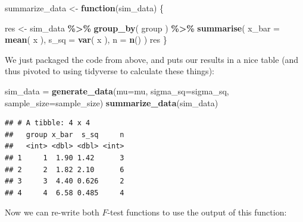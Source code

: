\documentclass[
]{book}
\newenvironment{Shaded}{\begin{snugshade}}{\end{snugshade}}
\newcommand{\AttributeTok}[1]{\textcolor[rgb]{0.13,0.29,0.53}{#1}}
\newcommand{\ControlFlowTok}[1]{\textcolor[rgb]{0.13,0.29,0.53}{\textbf{#1}}}
\newcommand{\FunctionTok}[1]{\textcolor[rgb]{0.13,0.29,0.53}{\textbf{#1}}}
\newcommand{\NormalTok}[1]{#1}
\newcommand{\OtherTok}[1]{\textcolor[rgb]{0.56,0.35,0.01}{#1}}
\newcommand{\SpecialCharTok}[1]{\textcolor[rgb]{0.81,0.36,0.00}{\textbf{#1}}}
\begin{document}
\begin{Shaded}
\begin{Highlighting}[]
\NormalTok{summarize\_data }\OtherTok{\textless{}{-}} \ControlFlowTok{function}\NormalTok{(sim\_data) \{}
  
\NormalTok{  res }\OtherTok{\textless{}{-}}\NormalTok{ sim\_data }\SpecialCharTok{\%\textgreater{}\%} 
    \FunctionTok{group\_by}\NormalTok{( group ) }\SpecialCharTok{\%\textgreater{}\%}
    \FunctionTok{summarise}\NormalTok{( }\AttributeTok{x\_bar =} \FunctionTok{mean}\NormalTok{( x ),}
               \AttributeTok{s\_sq =} \FunctionTok{var}\NormalTok{( x ),}
               \AttributeTok{n =} \FunctionTok{n}\NormalTok{() )}
\NormalTok{  res}
\NormalTok{\}}
\end{Highlighting}
\end{Shaded}

We just packaged the code from above, and puts our results in a nice table (and thus pivoted to using tidyverse to calculate these things):

\begin{Shaded}
\begin{Highlighting}[]
\NormalTok{sim\_data }\OtherTok{=} \FunctionTok{generate\_data}\NormalTok{(}\AttributeTok{mu=}\NormalTok{mu, }\AttributeTok{sigma\_sq=}\NormalTok{sigma\_sq, }\AttributeTok{sample\_size=}\NormalTok{sample\_size)}
\FunctionTok{summarize\_data}\NormalTok{(sim\_data)}
\end{Highlighting}
\end{Shaded}

\begin{verbatim}
## # A tibble: 4 x 4
##   group x_bar  s_sq     n
##   <int> <dbl> <dbl> <int>
## 1     1  1.90 1.42      3
## 2     2  1.82 2.10      6
## 3     3  4.40 0.626     2
## 4     4  6.58 0.485     4
\end{verbatim}

Now we can re-write both \(F\)-test functions to use the output of this function:
\end{document}
